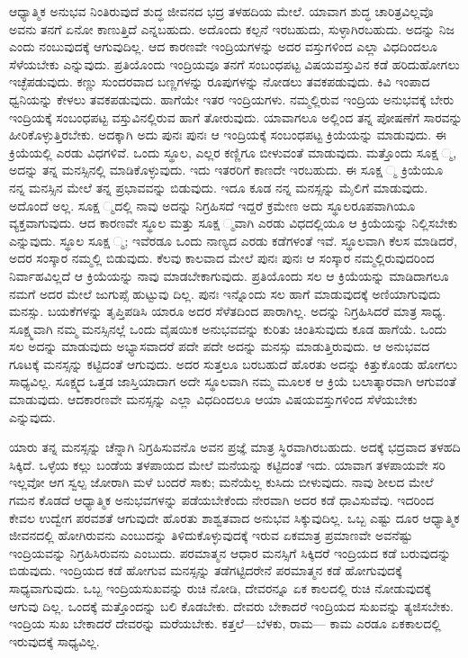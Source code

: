 ಆಧ್ಯಾತ್ಮಿಕ ಅನುಭವ ನಿಂತಿರುವುದೆ ಶುದ್ಧ ಜೀವನದ ಭದ್ರ ತಳಹದಿಯ ಮೇಲೆ. ಯಾವಾಗ ಶುದ್ಧ ಚಾರಿತ್ರವಿಲ್ಲವೊ ಅವನು ತನಗೆ ಏನೋ ಕಾಣುತ್ತಿದೆ ಎನ್ನಬಹುದು. ಅದೊಂದು ಕಲ್ಪನೆ ಇರಬಹುದು, ಸುಳ್ಳಾಗಿರಬಹುದು. ಅದನ್ನು ನಿಜ ಎಂದು ನಂಬುವುದಕ್ಕೆ ಆಗುವುದಿಲ್ಲ. ಆದ ಕಾರಣವೇ ಇಂದ್ರಿಯಗಳನ್ನು ಅದರ ವಸ್ತುಗಳಿಂದ ಎಲ್ಲಾ ವಿಧದಿಂದಲೂ ಸೆಳೆಯಬೇಕು ಎನ್ನುವುದು. ಪ್ರತಿಯೊಂದು ಇಂದ್ರಿಯವೂ ತನಗೆ ಸಂಬಂಧಪಟ್ಟ ವಿಷಯವಸ್ತುವಿನ ಕಡೆ ಹರಿದುಹೋಗಲು ಇಚ್ಛೆಪಡುವುದು. ಕಣ್ಣು ಸುಂದರವಾದ ಬಣ್ಣಗಳನ್ನು ರೂಪುಗಳನ್ನು ನೋಡಲು ತವಕಪಡುವುದು. ಕಿವಿ ಇಂಪಾದ ಧ್ವನಿಯನ್ನು ಕೇಳಲು ತವಕಪಡುವುದು. ಹಾಗೆಯೇ ಇತರ ಇಂದ್ರಿಯಗಳು. ನಮ್ಮಲ್ಲಿರುವ ಇಂದ್ರಿಯ ಅನುಭವಕ್ಕೆ ಬೇರು ಇಂದ್ರಿಯಕ್ಕೆ ಸಂಬಂಧಪಟ್ಟ ವಸ್ತುವಿನಲ್ಲಿರುವ ಹಾಗೆ ತೋರುವುದು. ಯಾವಾಗಲೂ ಅಲ್ಲಿಂದ ತನ್ನ ಪೋಷಣೆಗೆ ಸಾರವನ್ನು ಹೀರಿಕೊಳ್ಳುತ್ತಿರಬೇಕು. ಅದಕ್ಕಾಗಿ ಅದು ಪುನಃ ಪುನಃ ಆ ಇಂದ್ರಿಯಕ್ಕೆ ಸಂಬಂಧಪಟ್ಟ ಕ್ರಿಯೆಯನ್ನು ಮಾಡುವುದು. ಈ ಕ್ರಿಯೆಯಲ್ಲಿ ಎರಡು ವಿಧಗಳಿವೆ. ಒಂದು ಸ್ಥೂಲ, ಎಲ್ಲರ ಕಣ್ಣಿಗೂ ಬೀಳುವಂತೆ ಮಾಡುವುದು. ಮತ್ತೊಂದು ಸೂಕ್ಷ ್ಮ, ಅದನ್ನು ತನ್ನ ಮನಸ್ಸಿನಲ್ಲಿ ಮಾಡಿಕೊಳ್ಳುವುದು. ಇದು ಇತರರಿಗೆ ಕಾಣದೇ ಇರಬಹುದು. ಈ ಸೂಕ್ಷ ್ಮ ಕ್ರಿಯೆಯೂ ನನ್ನ ಮನಸ್ಸಿನ ಮೇಲೆ ತನ್ನ ಪ್ರಭಾವವನ್ನು ಬಿಡುವುದು. ಇದೂ ಕೂಡ ನನ್ನ ಮನಸ್ಸನ್ನು ಮೈಲಿಗೆ ಮಾಡುವುದು. ಅದೊಂದೆ ಅಲ್ಲ. ಸೂಕ್ಷ ್ಮದಲ್ಲಿ ನಾವು ಅದನ್ನು ನಿಗ್ರಹಿಸದೆ ಇದ್ದರೆ ಕ್ರಮೇಣ ಅದು ಸ್ಥೂಲರೂಪವಾಗಿಯೂ ವ್ಯಕ್ತವಾಗುವುದು. ಆದ ಕಾರಣವೇ ಸ್ಥೂಲ ಮತ್ತು ಸೂಕ್ಷ ್ಮವಾಗಿ ಎರಡು ವಿಧದಲ್ಲಿಯೂ ಆ ಕ್ರಿಯೆಯನ್ನು ನಿಲ್ಲಿಸಬೇಕು ಎನ್ನುವುದು. ಸ್ಥೂಲ ಸೂಕ್ಷ ್ಮ; ಇವೆರಡೂ ಒಂದು ನಾಣ್ಯದ ಎರಡು ಕಡೆಗಳಂತೆ ಇವೆ. ಸ್ಥೂಲವಾಗಿ ಕೆಲಸ ಮಾಡಿದರೆ, ಅದರ ಸಂಸ್ಕಾರ ನಮ್ಮಲ್ಲಿ ಬಿಡುವುದು. ಕೆಲವು ಕಾಲವಾದ ಮೇಲೆ ಪುನಃ ಪುನಃ ಆ ಸಂಸ್ಕಾರ ನಮ್ಮಲ್ಲಿರುವುದರಿಂದ ನಿರ್ವಾಹವಿಲ್ಲದೆ ಆ ಕ್ರಿಯೆಯನ್ನು ನಾವು ಮಾಡಬೇಕಾಗುವುದು. ಪ್ರತಿಯೊಂದು ಸಲ ಆ ಕ್ರಿಯೆಯನ್ನು ಮಾಡಿದಾಗಲೂ ನಮಗೆ ಅದರ ಮೇಲೆ ಜುಗುಪ್ಸೆ ಹುಟ್ಟುವು ದಿಲ್ಲ. ಪುನಃ ಇನ್ನೊಂದು ಸಲ ಹಾಗೆ ಮಾಡುವುದಕ್ಕೆ ಅಣಿಯಾಗುವುದು ಮನಸ್ಸು. ಬಯಕೆಗಳನ್ನು ತೃಪ್ತಿಪಡಿಸಿ ಯಾರೂ ಅದರ ಸೆಳೆತದಿಂದ ಪಾರಾಗಿಲ್ಲ. ಅದನ್ನು ನಿಗ್ರಹಿಸಿದರೆ ಮಾತ್ರ ಸಾಧ್ಯ. ಸೂಕ್ಷ್ಮವಾಗಿ ನಮ್ಮ ಮನಸ್ಸಿನಲ್ಲೆ ಒಂದು ವೈಷಯಿಕ ಅನುಭವವನ್ನು ಕುರಿತು ಚಿಂತಿಸುವುದು ಕೂಡ ಹಾಗೆಯೆ. ಒಂದು ಸಲ ಅದನ್ನು ಮಾಡುವುದು ಅಭ್ಯಾಸವಾದರೆ ಪದೇ ಪದೇ ಅದನ್ನು ಮನಸ್ಸು ಮಾಡುತ್ತಿರುವುದು. ಆ ಅನುಭವದ ಗೂಟಕ್ಕೆ ಮನಸ್ಸನ್ನು ಕಟ್ಟಿದಂತೆ ಆಗುವುದು. ಅದರ ಸುತ್ತಲೂ ಬರಬಹುದೆ ಹೊರತು ಅದನ್ನು ಕಿತ್ತುಕೊಂಡು ಹೋಗಲು ಸಾಧ್ಯವಿಲ್ಲ. ಸೂಕ್ಷ್ಮದ ಒತ್ತಡ ಜಾಸ್ತಿಯಾದಾಗ ಅದೇ ಸ್ಥೂಲವಾಗಿ ನಮ್ಮ ಮೂಲಕ ಆ ಕ್ರಿಯೆ ಬಲಾತ್ಕಾರವಾಗಿ ಆಗುವಂತೆ ಮಾಡುವುದು. ಆದಕಾರಣವೇ ಮನಸ್ಸನ್ನು ಎಲ್ಲಾ ವಿಧದಿಂದಲೂ ಆಯಾ ವಿಷಯವಸ್ತುಗಳಿಂದ ಸೆಳೆಯಬೇಕು ಎನ್ನುವುದು.

ಯಾರು ತನ್ನ ಮನಸ್ಸನ್ನು ಚೆನ್ನಾಗಿ ನಿಗ್ರಹಿಸುವನೊ ಅವನ ಪ್ರಜ್ಞೆ ಮಾತ್ರ ಸ್ಥಿರವಾಗಿರಬಹುದು. ಅದಕ್ಕೆ ಭದ್ರವಾದ ತಳಹದಿ ಸಿಕ್ಕಿದೆ. ಒಳ್ಳೆಯ ಕಲ್ಲು ಬಂಡೆಯ ತಳಪಾಯದ ಮೇಲೆ ಮನೆಯನ್ನು ಕಟ್ಟಿದಂತೆ ಇದು. ಯಾವಾಗ ತಳಪಾಯವೇ ಸರಿ ಇಲ್ಲವೋ ಆಗ ಸ್ವಲ್ಪ ಜೋರಾಗಿ ಮಳೆ ಬಂದರೆ ಸಾಕು; ಮನೆಯೆಲ್ಲ ಕುಸಿದು ಬೀಳುವುದು. ನಾವು ಶೀಲದ ಮೇಲೆ ಗಮನ ಕೊಡದೆ ಆಧ್ಯಾತ್ಮಿಕ ಅನುಭವಗಳನ್ನು ಪಡೆಯಬೇಕೆಂದು ನೇರವಾಗಿ ಅದರ ಕಡೆ ಧಾವಿಸುವೆವು. ಇದರಿಂದ ಕೇವಲ ಉದ್ವೇಗ ಪರವಶತೆ ಆಗುವುದೇ ಹೊರತು ಶಾಶ್ವತವಾದ ಅನುಭವ ಸಿಕ್ಕುವುದಿಲ್ಲ. ಒಬ್ಬ ಎಷ್ಟು ದೂರ ಆಧ್ಯಾತ್ಮಿಕ ಜೀವನದಲ್ಲಿ ಹೋಗಿರುವನು ಎಂಬುದನ್ನು ತಿಳಿದುಕೊಳ್ಳುವುದಕ್ಕೆ ಇರುವ ಏಕಮಾತ್ರ ಪ್ರಮಾಣವೇ ಅವನೆಷ್ಟು ಇಂದ್ರಿಯವನ್ನು ನಿಗ್ರಹಿಸಿರುವನು ಎಂಬುದು. ಪರಮಾತ್ಮನ ಆಧಾರ ಮನಸ್ಸಿಗೆ ಸಿಕ್ಕಿದರೆ ಇಂದ್ರಿಯದ ಕಡೆ ಬರುವುದನ್ನು ಬಿಡುವುದು. ಇಂದ್ರಿಯದ ಕಡೆ ಹೋಗುವ ಮನಸ್ಸನ್ನು ತಡೆಗಟ್ಟಿದರೇನೆ ಪರಮಾತ್ಮನ ಕಡೆ ಹೋಗುವುದಕ್ಕೆ ಸಾಧ್ಯವಾಗುವುದು. ಒಬ್ಬ ಇಂದ್ರಿಯಸುಖವನ್ನು ರುಚಿ ನೋಡಿ, ದೇವರನ್ನೂ ಏಕ ಕಾಲದಲ್ಲಿ ರುಚಿ ನೋಡುವುದಕ್ಕೆ ಆಗುವು ದಿಲ್ಲ. ಒಂದಕ್ಕೆ ಮತ್ತೊಂದನ್ನು ಬಲಿ ಕೊಡಬೇಕು. ದೇವರು ಬೇಕಾದರೆ ಇಂದ್ರಿಯದ ಸುಖವನ್ನು ತ್ಯಜಿಸಬೇಕು. ಇಂದ್ರಿಯ ಸುಖ ಬೇಕಾದರೆ ದೇವರನ್ನು ಮರೆಯಬೇಕು. ಕತ್ತಲೆ—ಬೆಳಕು, ರಾಮ— ಕಾಮ ಎರಡೂ ಏಕಕಾಲದಲ್ಲಿ ಇರುವುದಕ್ಕೆ ಸಾಧ್ಯವಿಲ್ಲ.

